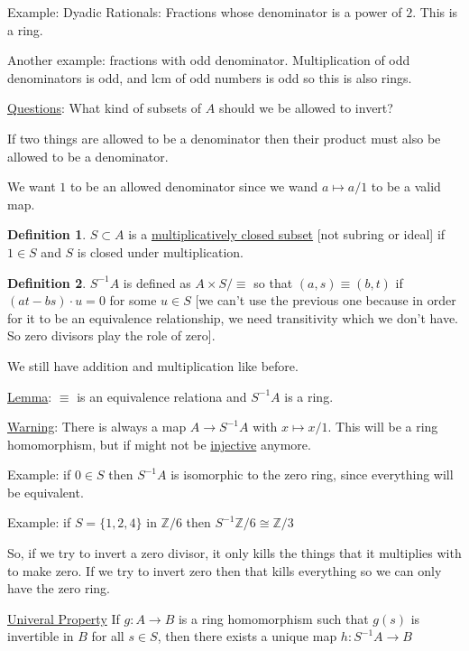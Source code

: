 \documentclass{article}
\theoremstyle{definition}
\newtheorem{definition}{Definition}
\begin{document}
Example: Dyadic Rationals: Fractions whose denominator is a power of \(2\). This is a ring.

Another example: fractions with odd denominator. Multiplication of odd denominators is odd, and lcm of odd numbers is odd so this is also rings.

\underline{Questions}: What kind of subsets of \(A\) should we be allowed to invert?

If two things are allowed to be a denominator then their product must also be allowed to be a denominator.

We want \(1\) to be an allowed denominator since we wand \(a \mapsto a / 1\) to be a valid map.

\begin{definition}
    \(S \subset A\) is a \underline{multiplicatively closed subset} [not subring or ideal] if \(1\in S\) and \(S\) is closed under multiplication.
\end{definition}

\begin{definition}
    \(S ^{-1} A\) is defined as \(A \times S / \equiv \) so that \((a,s) \equiv (b,t)\) if \((at - bs)\cdot u = 0\) for some \(u\in S\) [we can't use the previous one because in order for it to be an equivalence relationship, we need transitivity which we don't have. So zero divisors play the role of zero].

    We still have addition and multiplication like before.
\end{definition}

\underline{Lemma}: \(\equiv\) is an equivalence relationa and \(S ^{-1} A\) is a ring.

\underline{Warning}: There is always a map \(A\to S ^{-1} A\) with \(x \mapsto x / 1\). This will be a ring homomorphism, but if might not be \underline{injective} anymore.

Example: if \(0\in S\) then \(S ^{-1} A\) is isomorphic to the zero ring, since everything will be equivalent.

Example: if \(S = \{ 1, 2, 4 \} \) in \(\mathbb{Z} / 6\) then \(S ^{-1} \mathbb{Z} / 6 \cong \mathbb{Z} / 3\)

So, if we try to invert a zero divisor, it only kills the things that it multiplies with to make zero. If we try to invert zero then that kills everything so we can only have the zero ring.

\underline{Univeral Property} If \(g: A \to B\) is a ring homomorphism such that \(g(s)\) is invertible in \(B\) for all \(s\in S\), then there exists a unique map \(h:S ^{-1} A \to B\) 
\end{document}
